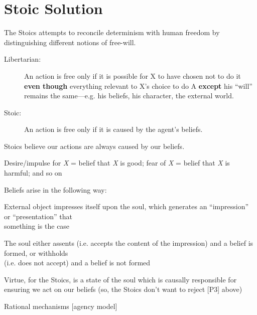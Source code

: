 \documentclass[11pt]{article}
\begin{document}
\section*{Stoic Solution}
\noindent The Stoics attempts to reconcile determinism with human freedom by distinguishing different notions of free-will. 
\begin{description}
\item[Libertarian:] An action is free only if it is possible for X to have chosen not to do it \textbf{even though} everything relevant to X's choice to do A \textbf{except} his ``will'' remains the same---e.g. his beliefs, his character, the external world.
\item[Stoic:] An action is free only if it is caused by the agent's beliefs.
\end{description}
\vspace*{2mm}



\noindent Stoics believe our actions are always caused by our beliefs.
\vspace*{2mm}

\noindent Desire/impulse for \emph{X} = belief that \emph{X} is good; fear of \emph{X} = belief that \emph{X} is harmful; and so on
\vspace*{2mm}

\noindent Beliefs arise in the following way: 
\vspace*{2mm}

External object impresses itself upon the soul, which generates an ``impression'' or ``presentation'' that\\\hspace*{6mm}something is the case
\vspace*{1mm}

The soul either assents (i.e. accepts the content of the impression) and a belief is formed, or withholds\\\hspace*{6mm}(i.e. does not accept) and a belief is not formed
\vspace*{2mm}

\noindent Virtue, for the Stoics, is a state of the soul which is causally responsible for ensuring we act on our beliefs (so, the Stoics don't want to reject [P3] above)
\vspace*{2mm}




\noindent Rational mechanisms [agency model]
\vspace*{1mm}
\end{document}
